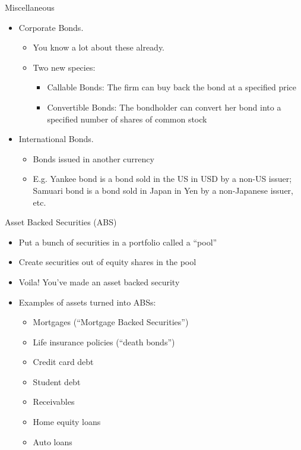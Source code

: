 \documentclass{beamer}
\begin{document}
\begin{frame}{Miscellaneous}
\begin{itemize}
\item Corporate Bonds.
\begin{itemize}
\item You know a lot about these already. 
\item Two new species:
\begin{itemize}
\item Callable Bonds: The firm can buy back the bond at a specified price
\item Convertible Bonds: The bondholder can convert her bond into a specified number of shares of common stock
\end{itemize}
\end{itemize}
\item International Bonds.
\begin{itemize}
\item Bonds issued in another currency
\item E.g. Yankee bond is a bond sold in the US in USD by a non-US issuer; Samuari bond is a bond sold in Japan in Yen by a non-Japanese issuer, etc. 
\end{itemize}
\end{itemize}
\end{frame}

\begin{frame}{Asset Backed Securities (ABS)}
	\begin{itemize}
		\item Put a bunch of securities in a portfolio called a ``pool''
		\item Create securities out of equity shares in the pool
		\item Voila! You've made an asset backed security
		\item Examples of assets turned into ABSs:
		\begin{itemize}
			\item Mortgages (``Mortgage Backed Securities'')
			\item Life insurance policies (``death bonds'')
			\item Credit card debt
			\item Student debt
			\item Receivables
			\item Home equity loans
			\item Auto loans
		\end{itemize}
	\end{itemize}
\end{frame}
\end{document}
